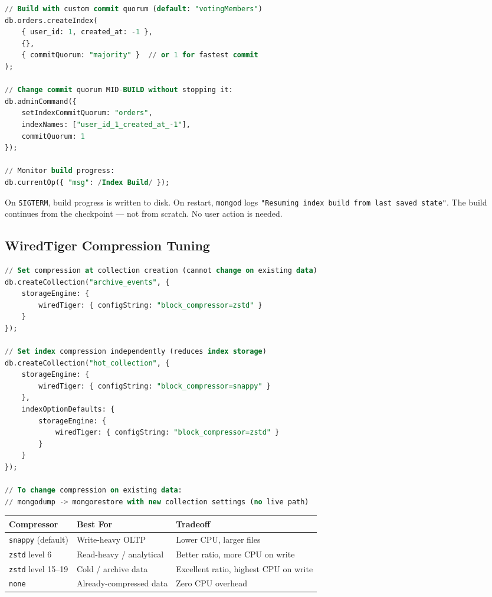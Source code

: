 \documentclass[12pt,a4paper]{article}
\begin{document}
\begin{lstlisting}[language=SQL, caption={Controlling index build commit quorum}]
// Build with custom commit quorum (default: "votingMembers")
db.orders.createIndex(
    { user_id: 1, created_at: -1 },
    {},
    { commitQuorum: "majority" }  // or 1 for fastest commit
);

// Change commit quorum MID-BUILD without stopping it:
db.adminCommand({
    setIndexCommitQuorum: "orders",
    indexNames: ["user_id_1_created_at_-1"],
    commitQuorum: 1
});

// Monitor build progress:
db.currentOp({ "msg": /Index Build/ });
\end{lstlisting}

\begin{tipbox}
On \texttt{SIGTERM}, build progress is written to disk. On restart, \texttt{mongod} logs \texttt{"Resuming index build from last saved state"}. The build continues from the checkpoint --- not from scratch. No user action is needed.
\end{tipbox}

\subsection{WiredTiger Compression Tuning}

\begin{lstlisting}[language=SQL, caption={Per-collection compression configuration}]
// Set compression at collection creation (cannot change on existing data)
db.createCollection("archive_events", {
    storageEngine: {
        wiredTiger: { configString: "block_compressor=zstd" }
    }
});

// Set index compression independently (reduces index storage)
db.createCollection("hot_collection", {
    storageEngine: {
        wiredTiger: { configString: "block_compressor=snappy" }
    },
    indexOptionDefaults: {
        storageEngine: {
            wiredTiger: { configString: "block_compressor=zstd" }
        }
    }
});

// To change compression on existing data:
// mongodump -> mongorestore with new collection settings (no live path)
\end{lstlisting}

\begin{center}
\begin{tabular}{lp{4cm}p{4cm}}
\toprule
\textbf{Compressor} & \textbf{Best For} & \textbf{Tradeoff} \\
\midrule
\texttt{snappy} (default) & Write-heavy OLTP & Lower CPU, larger files \\
\texttt{zstd} level 6 & Read-heavy / analytical & Better ratio, more CPU on write \\
\texttt{zstd} level 15--19 & Cold / archive data & Excellent ratio, highest CPU on write \\
\texttt{none} & Already-compressed data & Zero CPU overhead \\
\bottomrule
\end{tabular}
\end{center}
\end{document}
